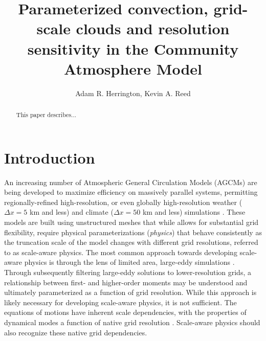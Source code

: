 \documentclass[times]{qjrms4}
\begin{document}

\title{Parameterized convection, grid-scale clouds and resolution sensitivity in the Community Atmosphere Model}

\author{Adam R. Herrington\corrauth, Kevin A. Reed}
\address{School of Marine and Atmospheric Sciences, Stony Brook University, Stony Brook, NY 11794}


\begin{abstract}
This paper describes...
\end{abstract}


\maketitle

\section{Introduction}

An increasing number of Atmospheric General Circulation Models (AGCMs) are being developed to maximize efficiency on massively parallel systems, permitting regionally-refined high-resolution, or even globally high-resolution weather ($\Delta x = 5$ km and less) and climate ($\Delta x = 50$ km and less) simulations \citep{MPASatm,Z2014QJRMS,HETAL2016JCLIM,DCMIP16,LetAl2018JAMES}. These models are built using unstructured meshes that while allows for substantial grid flexibility, require physical parameterizations ({\em{physics}}) that behave consistently as the truncation scale of the model changes with different grid resolutions, referred to as scale-aware physics. The most common approach towards developing scale-aware physics is through the lens of limited area, large-eddy simulations \citep[e.g.,][]{PC2008JAS,AW2013JAS,SZ2018JCLIM}. Through subsequently filtering large-eddy solutions to lower-resolution grids, a relationship between first- and higher-order moments \citep{G1992JFM} may be understood and ultimately parameterized as a function of grid resolution. While this approach is likely necessary for developing scale-aware physics, it is not sufficient. The equations of motions have inherent scale dependencies, with the properties of dynamical modes a function of native grid resolution \citep{O1981JAS,WETAL1997MWR,PG2006JAS,JR2016QJRMS}. Scale-aware physics should also recognize these native grid dependencies.
\end{document}
